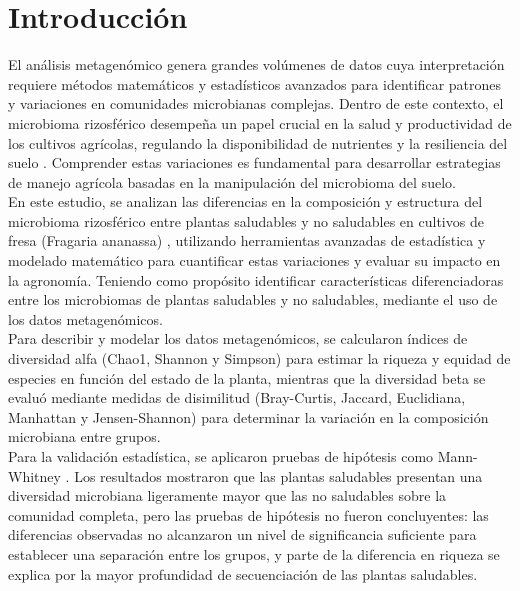 \documentclass[11pt]{book}
\begin{document}
\chapter*{Introducción}
\thispagestyle{empty}

El análisis metagenómico genera grandes volúmenes de datos cuya interpretación requiere métodos matemáticos y estadísticos avanzados para identificar patrones y variaciones en comunidades microbianas complejas. Dentro de este contexto, el microbioma rizosférico desempeña un papel crucial en la salud y productividad de los cultivos agrícolas, regulando la disponibilidad de nutrientes y la resiliencia del suelo \cite{kumar2019microbiome} \cite{rosenberg2021microbiomes}. Comprender estas variaciones es fundamental para desarrollar estrategias de manejo agrícola basadas en la manipulación del microbioma del suelo.\\

En este estudio, se analizan las diferencias en la composición y estructura del microbioma rizosférico entre plantas saludables y no saludables en cultivos de fresa (Fragaria ananassa) \cite{yang2020comparison}, utilizando herramientas avanzadas de estadística y modelado matemático \cite{xia2018statistical} para cuantificar estas variaciones y evaluar su impacto en la agronomía. Teniendo como propósito identificar características diferenciadoras entre los microbiomas de plantas saludables y no saludables, mediante el uso de los datos metagenómicos.\\

Para describir y modelar los datos metagenómicos, se calcularon índices de diversidad alfa (Chao1, Shannon y Simpson) para estimar la riqueza y equidad de especies en función del estado de la planta, mientras que la diversidad beta se evaluó mediante medidas de disimilitud (Bray-Curtis, Jaccard, Euclidiana, Manhattan y Jensen-Shannon) para determinar la variación en la composición microbiana entre grupos. \\

Para la validación estadística, se aplicaron pruebas de hipótesis como Mann-Whitney \cite{wackerly2002estadistica}. Los resultados mostraron que las plantas saludables presentan una diversidad microbiana ligeramente mayor que las no saludables sobre la comunidad completa, pero las pruebas de hipótesis no fueron concluyentes: las diferencias observadas no alcanzaron un nivel de significancia suficiente para establecer una separación entre los grupos, y parte de la diferencia en riqueza se explica por la mayor profundidad de secuenciación de las plantas saludables. \\
\end{document}
